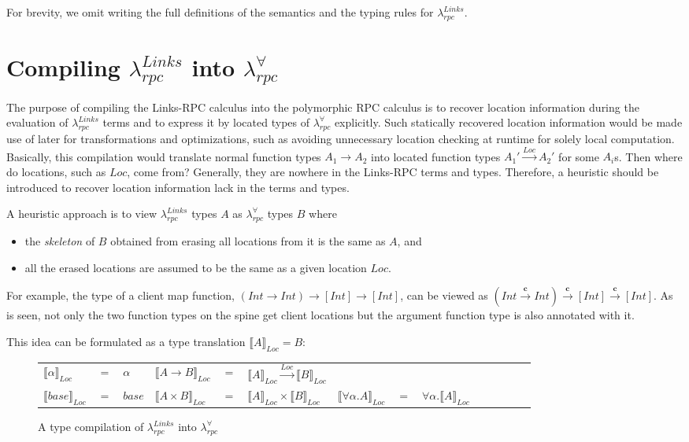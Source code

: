 \documentclass[a4paper]{article}
\theoremstyle{plain}
\theoremstyle{definition}
\newcommand{\polyrpc}{$\lambda_{rpc}^{\forall}$\xspace}
\newcommand{\linksrpc}{$\lambda_{rpc}^{Links}$\xspace}
\newcommand{\client}{\textbf{c}}
\newcommand{\funL}[1]{\xrightarrow{#1}}
\newcommand{\linkstycomp}[2]{\llbracket#1\rrbracket_{#2}}
\newcommand{\Loc}{Loc}
\begin{document}
For brevity, we omit writing the full definitions of the semantics and
the typing rules for \linksrpc.

\section{Compiling \linksrpc into \polyrpc}
\label{sec:translationtopolyrpc}

The purpose of compiling the Links-RPC calculus into the polymorphic
RPC calculus is to recover location information during the evaluation of
\linksrpc terms and to express it by located types of \polyrpc explicitly.
%
Such statically recovered location information would be made use of
later for transformations and optimizations, such as avoiding
unnecessary location checking at runtime for solely local computation.
%
Basically, this compilation would translate normal function types
$A_1 \rightarrow A_2$ into located function types $A_1' \funL{\Loc}
A_2'$ for some $A_i$s.
%
Then where do locations, such as $\Loc$, come from?
%
Generally, they are nowhere in the Links-RPC terms and types.
%
Therefore, a heuristic should be introduced to recover location
information lack in the terms and types.


A heuristic approach is to view \linksrpc types $A$ as \polyrpc types $B$ where
%
\begin{itemize}
  \item the {\it skeleton} of $B$ obtained from erasing all locations
    from it is the same as $A$, and
  \item all the erased locations are assumed to be the same as a given
    location $\Loc$.
\end{itemize}
%
For example, the type of a client map function, $(Int \rightarrow Int)
\rightarrow [Int] \rightarrow [Int]$, can be viewed as $(Int \funL{\client}
Int) \funL{\client} [Int] \funL{\client} [Int]$.
%
As is seen, not only the two function types on the spine get client
locations but the argument function type is also annotated with it.


%
This idea can be formulated as a type translation $\linkstycomp{A}{\Loc} = B$:

\begin{figure}[h]
\centering
\begin{tabular}{l l l l l l l l l l l l l l}
$\linkstycomp{\alpha}{\Loc}$ & $=$ & $\alpha$
&
$\linkstycomp{A \funL{} B}{\Loc}$ & $=$ & $\linkstycomp{A}{\Loc} \funL{Loc} \linkstycomp{B}{\Loc}$
\\
$\linkstycomp{base}{\Loc}$ & $=$ & $base$
&
$\linkstycomp{A\times B}{\Loc}$ & $=$ & $\linkstycomp{A}{\Loc}\times \linkstycomp{B}{\Loc}$
&
$\linkstycomp{\forall\alpha.A}{\Loc}$ & $=$ & $\forall\alpha.\linkstycomp{A}{\Loc}$
\\
\end{tabular}
\caption{A type compilation of \linksrpc into \polyrpc}
\label{fig:typecompilation}
\end{figure}
\end{document}

